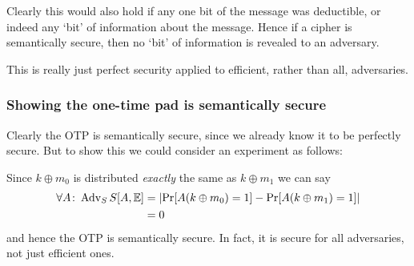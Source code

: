 \documentclass[10pt,a4paper]{report}
\begin{document}
Clearly this would also hold if any one bit of the message was deductible, or indeed any `bit' of
information about the message. Hence if a cipher is semantically secure, then no `bit' of
information is revealed to an adversary.

This is really just perfect security applied to efficient, rather than all, adversaries.

\subsubsection*{Showing the one-time pad is semantically secure}

Clearly the OTP is semantically secure, since we already know it to be perfectly secure. But to
show this we could consider an experiment as follows:

\begin{figure}[H]
    \centering
\end{figure}

Since $k \oplus m_0$ is distributed \textit{exactly} the same as $k \oplus m_1$ we can say
\begin{equation*}
\begin{aligned}
    \forall A \colon \operatorname{Adv}_SS[A, \mathbb{E}] &=
        \abs{\operatorname{Pr}[A(k \oplus m_0) = 1] - \operatorname{Pr}[A(k \oplus m_1) = 1]}\\
    &= 0
\end{aligned}
\end{equation*}
and hence the OTP is semantically secure. In fact, it is secure for all adversaries, not just
efficient ones.
\end{document}
